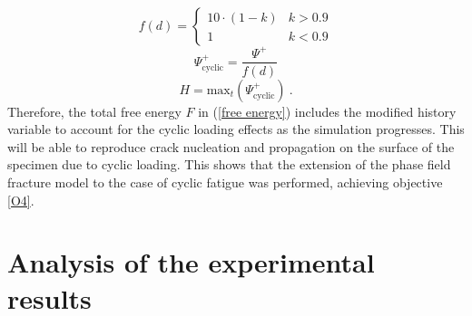 \documentclass[11pt,a4paper]{article}
\begin{document}
\begin{equation}
 f(d) = 
 \begin{cases}
 10\cdot(1-k) & k > 0.9 \\
 1 & k < 0.9
 \label{degradation}
 \end{cases}
\end{equation}
\begin{equation}
\Psi^+_{\textrm{cyclic}}= \frac{\Psi^+}{f(d)}
\label{Psi plus}
\end{equation}
\begin{equation}
H = \textrm{max}_t( \Psi^+_{\textrm{cyclic}} ) \ .
\label{H_modified}
\end{equation}
Therefore, the total free energy $F$ in (\ref{free energy}) includes the modified history variable to account for the cyclic loading effects as the simulation progresses. This will be able to reproduce crack nucleation and propagation on the surface of the specimen due to cyclic loading. This shows that the extension of the phase field fracture model to the case of cyclic fatigue was performed, achieving objective \ref{O4}. 

\section{Analysis of the experimental results}
\end{document}
